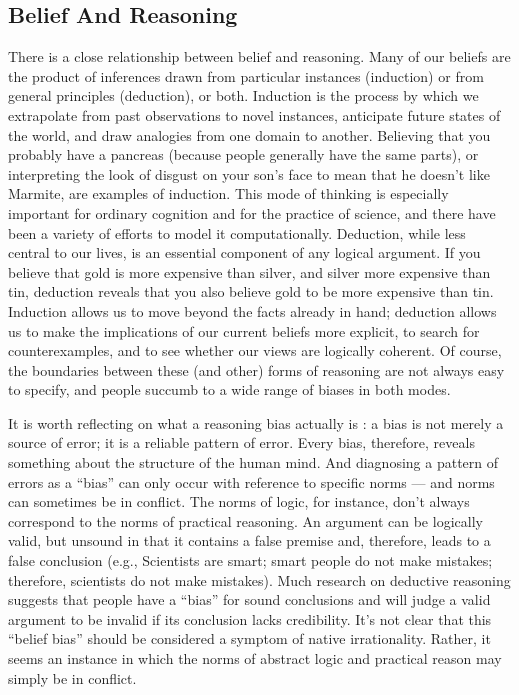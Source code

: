 \documentclass[a4paper,14pt]{extbook}
\begin{document}
\subsection{Belief And Reasoning}

There is a close relationship between belief and reasoning.
Many of our beliefs are the product of inferences drawn from particular instances (induction) or from general principles (deduction), or both.
Induction is the process by which we extrapolate from past observations to novel instances, anticipate future states of the world, and draw analogies from one domain to another.
Believing that you probably have a pancreas (because people generally have the same parts), or interpreting the look of disgust on your son’s face to mean that he doesn’t like Marmite, are examples of induction.
This mode of thinking is especially important for ordinary cognition and for the practice of science, and there have been a variety of efforts to model it computationally.
Deduction, while less central to our lives, is an essential component of any logical argument.
If you believe that gold is more expensive than silver, and silver more expensive than tin, deduction reveals that you also believe gold to be more expensive than tin.
Induction allows us to move beyond the facts already in hand;
deduction allows us to make the implications of our current beliefs more explicit, to search for counterexamples, and to see whether our views are logically coherent.
Of course, the boundaries between these (and other) forms of reasoning are not always easy to specify, and people succumb to a wide range of biases in both modes.

It is worth reflecting on what a reasoning bias actually is :
a bias is not merely a source of error;
it is a reliable pattern of error.
Every bias, therefore, reveals something about the structure of the human mind.
And diagnosing a pattern of errors as a ``bias'' can only occur with reference to specific norms --- and norms can sometimes be in conflict.
The norms of logic, for instance, don’t always correspond to the norms of practical reasoning.
An argument can be logically valid, but unsound in that it contains a false premise and, therefore, leads to a false conclusion (e.g., Scientists are smart;
smart people do not make mistakes;
therefore, scientists do not make mistakes).
Much research on deductive reasoning suggests that people have a ``bias'' for sound conclusions and will judge a valid argument to be invalid if its conclusion lacks credibility.
It’s not clear that this ``belief bias'' should be considered a symptom of native irrationality.
Rather, it seems an instance in which the norms of abstract logic and practical reason may simply be in conflict.
\end{document}
